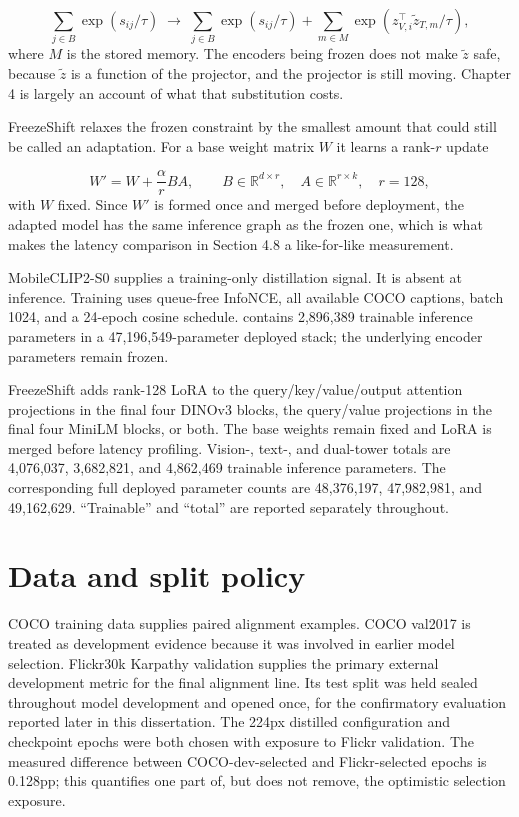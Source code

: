 \begin{equation*}
\sum_{j \in B} \exp(s_{ij} / \tau)
\;\longrightarrow\;
\sum_{j \in B} \exp(s_{ij} / \tau)
+ \sum_{m \in M} \exp\!\left(z_{V,i}^{\top} \tilde{z}_{T,m} / \tau\right),
\end{equation*}
where $M$ is the stored memory. The encoders being frozen does not make $\tilde{z}$ safe, because $\tilde{z}$ is a function of the projector, and the projector is still moving. Chapter 4 is largely an account of what that substitution costs.

FreezeShift relaxes the frozen constraint by the smallest amount that could still be called an adaptation. For a base weight matrix $W$ it learns a rank-$r$ update

\begin{equation*}
W' = W + \frac{\alpha}{r} BA,
\qquad
B \in \mathbb{R}^{d \times r},
\quad
A \in \mathbb{R}^{r \times k},
\quad
r = 128,
\end{equation*}
with $W$ fixed. Since $W'$ is formed once and merged before deployment, the adapted model has the same inference graph as the frozen one, which is what makes the latency comparison in Section 4.8 a like-for-like measurement.

MobileCLIP2-S0 supplies a training-only distillation signal. It is absent at inference. Training uses queue-free InfoNCE, all available COCO captions, batch 1024, and a 24-epoch cosine schedule. \MTone{} contains 2,896,389 trainable inference parameters in a 47,196,549-parameter deployed stack; the underlying encoder parameters remain frozen.

FreezeShift adds rank-128 LoRA to the query/key/value/output attention projections in the final four DINOv3 blocks, the query/value projections in the final four MiniLM blocks, or both. The base weights remain fixed and LoRA is merged before latency profiling. Vision-, text-, and dual-tower totals are 4,076,037, 3,682,821, and 4,862,469 trainable inference parameters. The corresponding full deployed parameter counts are 48,376,197, 47,982,981, and 49,162,629. ``Trainable'' and ``total'' are reported separately throughout.

\section{Data and split policy}
COCO training data supplies paired alignment examples. COCO val2017 is treated as development evidence because it was involved in earlier model selection. Flickr30k Karpathy validation supplies the primary external development metric for the final alignment line. Its test split was held sealed throughout model development and opened once, for the confirmatory evaluation reported later in this dissertation. The 224px distilled configuration and checkpoint epochs were both chosen with exposure to Flickr validation. The measured difference between COCO-dev-selected and Flickr-selected epochs is 0.128pp; this quantifies one part of, but does not remove, the optimistic selection exposure.


